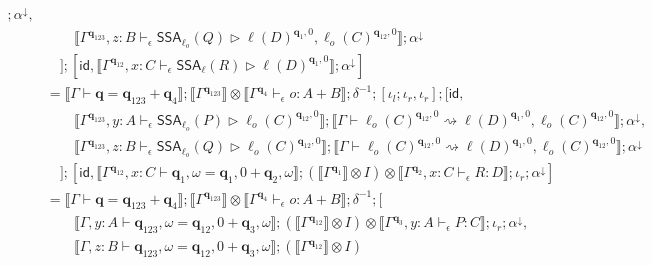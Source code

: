 \documentclass[acmsmall,screen,review]{acmart}
\newcommand{\mb}[1]{\ensuremath{\mathbf{#1}}}
\newcommand{\ms}[1]{\ensuremath{\mathsf{#1}}}
\newcommand{\qsp}[4]{#1 \vdash #2 = #3 + #4}
\newcommand{\lwk}[3]{#1 \vdash #2 \rightsquigarrow #3}
\newcommand{\hasty}[4]{#1 \vdash_{#2} #3: {#4}}
\newcommand{\haslb}[4]{#1 \vdash_{#2} #3 \rhd #4}
\newcommand{\tossa}[2]{\ms{SSA}_{#1}(#2)}
\newcommand{\dnt}[1]{\llbracket{#1}\rrbracket}
\begin{document}
\begin{itemize}
\begin{align*}
{        } ; \alpha^\downarrow, \\ & \qquad
        \dnt{
          \haslb{\Gamma^{\mb{q}_{123}}, z : B}{\epsilon}{\tossa{\ell_o}{Q}}
                {\ell(D)^{\mb{q}_1, 0}, \ell_o(C)^{\mb{q}_{12}, 0}} 
        } ; \alpha^\downarrow
      \\ & \quad
      ];[
        \ms{id}, 
        \dnt{\haslb{\Gamma^{\mb{q}_{12}}, x : C}{\epsilon}{\tossa{\ell}{R}}
              {\ell(D)^{\mb{q}_1, 0}}} ; \alpha^\downarrow
      ] \\
    & = \dnt{\qsp{\Gamma}{\mb{q}}{\mb{q}_{123}}{\mb{q}_4}} 
      ; \dnt{\Gamma^{\mb{q}_{123}}} \otimes \dnt{\hasty{\Gamma^{\mb{q}_4}}{\epsilon}{o}{A + B}}
      ; \delta^{-1} ; [
        \iota_l ; \iota_r,
        \iota_r
      ];[
        \ms{id}, \\ & \qquad
          \dnt{
            \haslb{\Gamma^{\mb{q}_{123}}, y : A}{\epsilon}{\tossa{\ell_o}{P}}
                  {\ell_o(C)^{\mb{q}_{12}, 0}}
          } 
          ; \dnt{\lwk{\Gamma}
              {\ell_o(C)^{\mb{q}_{12}, 0}}{\ell(D)^{\mb{q}_1, 0}, \ell_o(C)^{\mb{q}_{12}, 0}}}
          ; \alpha^\downarrow, \\ & \qquad
          \dnt{
            \haslb{\Gamma^{\mb{q}_{123}}, z : B}{\epsilon}{\tossa{\ell_o}{Q}}
                  {\ell_o(C)^{\mb{q}_{12}, 0}} 
          }
          ; \dnt{\lwk{\Gamma}
              {\ell_o(C)^{\mb{q}_{12}, 0}}{\ell(D)^{\mb{q}_1, 0}, \ell_o(C)^{\mb{q}_{12}, 0}}}
          ; \alpha^\downarrow
      \\ & \quad
      ];[
        \ms{id}, 
        \dnt{\qsp{\Gamma^{\mb{q}_{12}}, x : C}{\mb{q}_1, \omega}{\mb{q}_1, 0}{\mb{q}_2, \omega}}
            ; (\dnt{\Gamma^{\mb{q}_1}} \otimes I) 
              \otimes \dnt{\hasty{\Gamma^{\mb{q}_2}, x : C}{\epsilon}{R}{D}}
            ; \iota_r
            ; \alpha^\downarrow
      ] \\
    & = \dnt{\qsp{\Gamma}{\mb{q}}{\mb{q}_{123}}{\mb{q}_4}} 
      ; \dnt{\Gamma^{\mb{q}_{123}}} \otimes \dnt{\hasty{\Gamma^{\mb{q}_4}}{\epsilon}{o}{A + B}}
      ; \delta^{-1} ;[ \\ & \qquad
          \dnt{\qsp{\Gamma, y : A}{\mb{q}_{123}, \omega}{\mb{q}_{12}, 0}{\mb{q}_3, \omega}}
          ; (\dnt{\Gamma^{\mb{q}_{12}}} \otimes I) 
              \otimes \dnt{\hasty{\Gamma^{\mb{q}_3}, y : A}{\epsilon}{P}{C}}
          ; \iota_r
          ; \alpha^\downarrow, \\ & \qquad
          \dnt{\qsp{\Gamma, z : B}{\mb{q}_{123}, \omega}{\mb{q}_{12}, 0}{\mb{q}_3, \omega}}
          ; (\dnt{\Gamma^{\mb{q}_{12}}} \otimes I) 

\end{align*}
\end{itemize}
\end{document}
